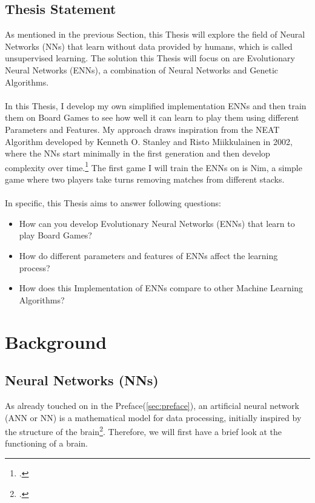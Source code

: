 \documentclass[11pt]{report}
\begin{document}
        \section{Thesis Statement}\label{sec:thesis-statement}
    As mentioned in the previous Section, this Thesis will explore the field of Neural Networks (NNs) that learn without data provided by humans, which is called unsupervised learning.
    The solution this Thesis will focus on are Evolutionary Neural Networks (ENNs), a combination of Neural Networks and Genetic Algorithms.
    \\ \\
    In this Thesis, I develop my own simplified implementation ENNs and then train them on Board Games to see how well it can learn to play them using different Parameters and Features.
    My approach draws inspiration from the NEAT Algorithm developed by Kenneth O. Stanley and Risto Miikkulainen in 2002, where the NNs start minimally in the first generation and then develop complexity over time.\footcite[p.105-106]{Neat_02}
    The first game I will train the ENNs on is Nim, a simple game where two players take turns removing matches from different stacks.
    \\ \\
    In specific, this Thesis aims to answer following questions:
    \begin{itemize}
        \item How can you develop Evolutionary Neural Networks (ENNs) that learn to play Board Games?
        \item How do different parameters and features of ENNs affect the learning process?
        \item How does this Implementation of ENNs compare to other Machine Learning Algorithms?
    \end{itemize}
    \chapter{Background}\label{ch:background}
    \section{Neural Networks (NNs)}\label{sec:neural-networks-(nns)}
    As already touched on in the Preface(\ref{sec:preface}), an artificial neural network (ANN or NN) is a mathematical model for data processing, initially inspired by the structure of the brain\footcite{Chandra_22}.
    Therefore, we will first have a brief look at the functioning of a brain.
\end{document}
